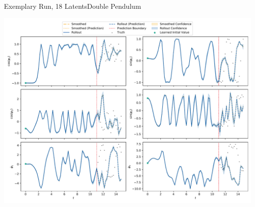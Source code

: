 \documentclass[
	aspectratio=43,
	color={accentcolor=1c},
	logo=false,
	colorframetitle=true,
	handout
]{tudabeamer}
\begin{document}
			\begin{frame}{Exemplary Run, 18 Latents}{Double Pendulum}
				\vspace{-0.5cm}
				\begin{center}
					\includegraphics[width=0.8\linewidth]{figures/experiments/acrobot-gym/rollout-observations-N0.pdf}
				\end{center}
			\end{frame}
\end{document}
